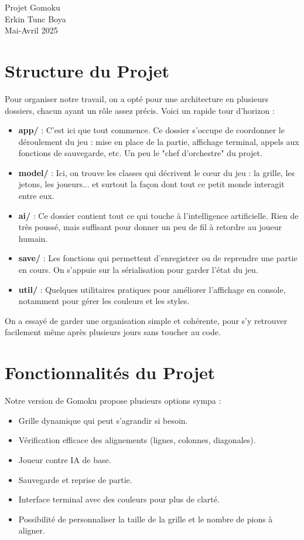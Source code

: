 \documentclass[a4paper,11pt]{article}
\begin{document}
\begin{center}
\Huge{Projet Gomoku}\\[0.5cm]
\Large{Erkin Tunc Boya}\\[0.2cm]
\Large{Mai-Avril 2025}
\end{center}

\section{Structure du Projet}

Pour organiser notre travail, on a opté pour une architecture en plusieurs dossiers, chacun ayant un rôle assez précis. Voici un rapide tour d'horizon :

\begin{itemize}
    \item \textbf{app/} : C'est ici que tout commence. Ce dossier s'occupe de coordonner le déroulement du jeu : mise en place de la partie, affichage terminal, appels aux fonctions de sauvegarde, etc. Un peu le "chef d'orchestre" du projet.
    \item \textbf{model/} : Ici, on trouve les classes qui décrivent le cœur du jeu : la grille, les jetons, les joueurs... et surtout la façon dont tout ce petit monde interagit entre eux.
    \item \textbf{ai/} : Ce dossier contient tout ce qui touche à l'intelligence artificielle. Rien de très poussé, mais suffisant pour donner un peu de fil à retordre au joueur humain.
    \item \textbf{save/} : Les fonctions qui permettent d'enregistrer ou de reprendre une partie en cours. On s'appuie sur la sérialisation pour garder l'état du jeu.
    \item \textbf{util/} : Quelques utilitaires pratiques pour améliorer l'affichage en console, notamment pour gérer les couleurs et les styles.
\end{itemize}

On a essayé de garder une organisation simple et cohérente, pour s'y retrouver facilement même après plusieurs jours sans toucher au code.

\section{Fonctionnalit\'es du Projet}

Notre version de Gomoku propose plusieurs options sympa :

\begin{itemize}
    \item Grille dynamique qui peut s'agrandir si besoin.
    \item V\'erification efficace des alignements (lignes, colonnes, diagonales).
    \item Joueur contre IA de base.
    \item Sauvegarde et reprise de partie.
    \item Interface terminal avec des couleurs pour plus de clart\'e.
    \item Possibilit\'e de personnaliser la taille de la grille et le nombre de pions \`a aligner.
\end{itemize}
\end{document}

